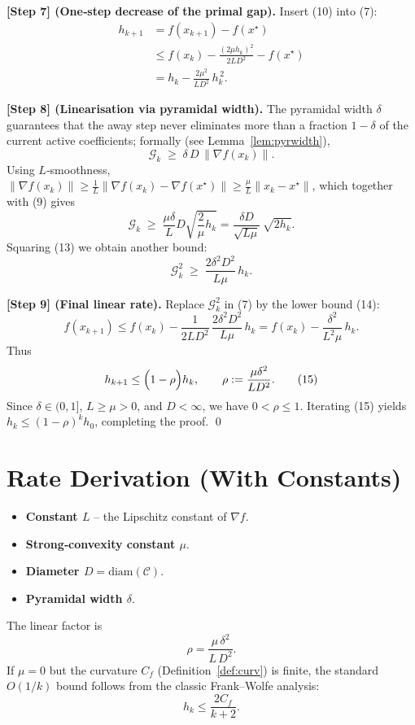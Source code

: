 \documentclass{article}
\newcommand{\gap}{\mathcal{G}}
\newcommand{\diam}{\mathrm{diam}}
\begin{document}
\noindent\textbf{[Step 7] (One‑step decrease of the primal gap).}
Insert (10) into (7):
\[
\begin{aligned}
h_{k+1}
&= f(x_{k+1})-f(x^\star)\\
&\le f(x_k)-\frac{(2\mu h_k)^2}{2L D^2}-f(x^\star)\\
&= h_k - \frac{2\mu^2}{L D^2}\,h_k^{\,2}.
\end{aligned}
\tag{11}
\]

\noindent\textbf{[Step 8] (Linearisation via pyramidal width).}
The pyramidal width $\delta$ guarantees that the away step never eliminates more than a fraction $1-\delta$ of the current active coefficients; formally (see Lemma~\ref{lem:pyrwidth}),
\[
\gap_k \;\ge\; \delta\, D\,\|\nabla f(x_k)\| .
\tag{12}
\]
Using $L$‑smoothness, $\|\nabla f(x_k)\|\ge \frac{1}{L}\| \nabla f(x_k)-\nabla f(x^\star)\|\ge \frac{\mu}{L}\|x_k-x^\star\|$, which together with (9) gives
\[
\gap_k \;\ge\; \frac{\mu\delta}{L}D\sqrt{\frac{2}{\mu}h_k}
= \frac{\delta D}{\sqrt{L\mu}}\,\sqrt{2h_k}.
\tag{13}
\]
Squaring (13) we obtain another bound:
\[
\gap_k^2 \;\ge\; \frac{2\delta^2 D^2}{L\mu}\,h_k .
\tag{14}
\]

\noindent\textbf{[Step 9] (Final linear rate).}
Replace $\gap_k^2$ in (7) by the lower bound (14):
\[
f(x_{k+1}) \le f(x_k)-\frac{1}{2L D^2}\,\frac{2\delta^2 D^2}{L\mu}\,h_k
= f(x_k)-\frac{\delta^2}{L^2\mu}\,h_k .
\]
Thus
\[
h_{k+1}\le\Bigl(1-\rho\Bigr)h_k,\qquad 
\rho:=\frac{\mu\delta^2}{L D^2}.
\tag{15}
\]
Since $\delta\in(0,1]$, $L\ge\mu>0$, and $D<\infty$, we have $0<\rho\le1$.
Iterating (15) yields $h_k\le (1-\rho)^k h_0$, completing the proof. \qed

\section*{Rate Derivation (With Constants)}
\begin{itemize}
    \item \textbf{Constant $L$} – the Lipschitz constant of $\nabla f$.
    \item \textbf{Strong‑convexity constant $\mu$}.
    \item \textbf{Diameter $D=\diam(\mathcal{C})$}.
    \item \textbf{Pyramidal width $\delta$}.
\end{itemize}
The linear factor is
\[
\rho = \frac{\mu\,\delta^{2}}{L\,D^{2}}.
\]
If $\mu=0$ but the curvature $C_f$ (Definition~\ref{def:curv}) is finite, the standard $O(1/k)$ bound follows from the classic Frank–Wolfe analysis:
\[
h_k \le \frac{2C_f}{k+2}.
\]
\end{document}
